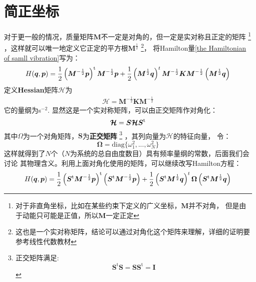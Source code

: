     \section{简正坐标}
    对于更一般的情况，质量矩阵$\bm{M}$不一定是对角的，但一定是实对称且正定的矩阵
    \footnote{对于非直角坐标，比如在某些约束下定义的广义坐标，$\bm{M}$并不对角，
    但是由于动能只可能是正值，所以$\bm{M}$一定正定}
    ，这样就可以唯一地定义它正定的平方根$\bm{M}^{\frac{1}{2}}$
    \footnote{这也是一个实对称矩阵，结论可以通过对角化这个矩阵来理解，详细的证明要参考线性代数教材}，
    将Hamilton量\ref{the Hamiltonian of samll vibration}写为：
    \begin{equation}
        H(\bm{q},\bm{p}) = \frac{1}{2}\left(\bm{M}^{-\frac{1}{2}}\bm{p}\right)^{\mathrm{t}}\bm{M}^{-\frac{1}{2}}\bm{p} + 
        \frac{1}{2}\left(\bm{M}^{\frac{1}{2}}\bm{q}\right)^{t}\bm{M}^{-\frac{1}{2}}\bm{K}\bm{M}^{-\frac{1}{2}}\left(\bm{M}^{\frac{1}{2}}\bm{q}\right)
    \end{equation}
    定义\textbf{Hessian}矩阵$\bm{\mathcal{H}}$为 
    \begin{equation}
        \begin{split}
            \bm{\mathcal{H}} = \bm{M}^{-\frac{1}{2}}\bm{K}\bm{M}^{-\frac{1}{2}}
        \end{split}
        \label{Hessian matrix}
    \end{equation}
    它的量纲为s$^{-2}$. 显然这是一个实对称矩阵，可以由正交矩阵作对角化：
    \begin{equation}
        \bm{\mathcal{H}} = \bm{S}\bm{\mathcal{H}S}^{\mathrm{t}}
    \end{equation}
    其中$\Omega$为一个对角矩阵，$\bm{S}$为\textbf{正交矩阵}
    \footnote{
        正交矩阵满足: 
    \begin{equation}
        \bm{S}^\mathrm{t}\bm{S} = \bm{SS}^\mathrm{t} = \bm{I}
    \end{equation}
    }
    ，其列向量为$\bm{\mathcal{H}}$的特征向量，
    令：
    \begin{equation}
        \bm{\Omega} = \mathrm{diag} \{\omega_1^2, ..., \omega_N^2 \}
    \end{equation}
    这样就得到了$N$个（$N$为系统的总自由度数目）具有频率量纲的常数，后面我们会讨论
    其物理含义。利用上面对角化使用的矩阵，可以继续改写Hamilton方程：
    \begin{equation}
        H(\bm{q},\bm{p}) = \frac{1}{2}\left(\bm{S}^{\mathrm{t}}\bm{M}^{-\frac{1}{2}}\bm{p}\right)^{\mathrm{t}}\left(\bm{S}^{\mathrm{t}}\bm{M}^{-\frac{1}{2}}\bm{p}\right) + 
        \frac{1}{2}\left(\bm{S}^{\mathrm{t}}\bm{M}^{\frac{1}{2}}\bm{q}\right)^{t}\bm{\Omega}\left(\bm{S}^{\mathrm{t}}\bm{M}^{\frac{1}{2}}\bm{q}\right)
    \end{equation}
